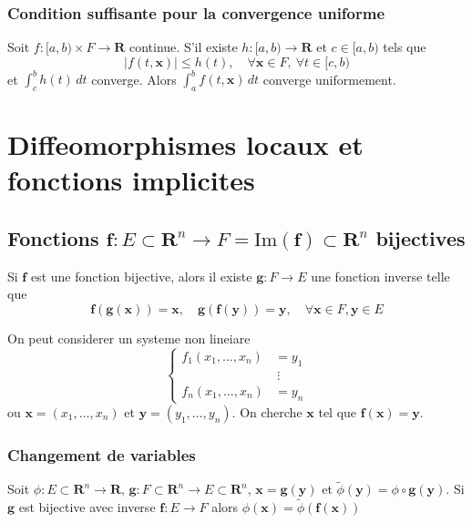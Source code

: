 \subsection*{Condition suffisante pour la convergence uniforme}

\begin{lemma}
Soit $f:[a,b)\times F\to \mathbf{R}$ continue. S'il existe $h:[a,b)\to \mathbf{R}$ et $c\in[a,b)$ tels que 
$$
\lvert f(t,\boldsymbol{x}) \rvert \le h(t),\quad \forall \boldsymbol{x}\in F,~\forall t\in[c,b)
$$
et $\int_{c}^{b} h(t) \, dt$ converge. Alors $\int_{a}^{b} f(t,\boldsymbol{x}) \, dt$ converge uniformement.
\end{lemma}

\chapter{Diffeomorphismes locaux et fonctions implicites}

\section{Fonctions \texorpdfstring{$\boldsymbol{f}:E\subset \mathbf{R}^{n}\to F=\mathrm{Im}(\boldsymbol{f})\subset\mathbf{R}^{n}$}{vectorielles} bijectives}

Si $\boldsymbol{f}$ est une fonction bijective, alors il existe $\boldsymbol{g}:F\to E$ une fonction inverse telle que 
$$
\boldsymbol{f}(\boldsymbol{g}(\boldsymbol{x}))=\boldsymbol{x},\quad \boldsymbol{g}(\boldsymbol{f}(\boldsymbol{y}))=\boldsymbol{y},\quad \forall \boldsymbol{x}\in F,\boldsymbol{y}\in E
$$

On peut considerer un systeme non lineiare
$$
\begin{cases}
f_{1}(x_{1},\dots,x_{n}) & =y_{1} \\
 & ~\vdots \\
f_{n}(x_{1},\dots,x_{n} ) & =y_{n}
\end{cases}
$$
ou $\boldsymbol{x}=(x_{1},\dots,x_{n})$ et $\boldsymbol{y}=(y_{1},\dots,y_{n})$. On cherche $\boldsymbol{x}$ tel que $\boldsymbol{f}(\boldsymbol{x})=\boldsymbol{y}$.

\subsection*{Changement de variables}

Soit $\phi:E\subset \mathbf{R}^{n}\to \mathbf{R}$, $\boldsymbol{g}:F\subset \mathbf{R}^{n}\to E\subset\mathbf{R}^{n}$, $\boldsymbol{x}=\boldsymbol{g}(\boldsymbol{y})$ et $\tilde{\phi}(\boldsymbol{y})=\phi \circ \boldsymbol{g}(\boldsymbol{y})$. Si $\boldsymbol{g}$ est bijective avec inverse $\boldsymbol{f}:E\to F$ alors $\phi(\boldsymbol{x})=\tilde{\phi}(\boldsymbol{f}(\boldsymbol{x}))$

